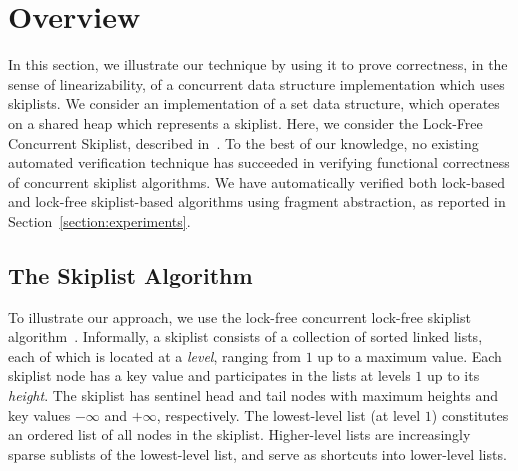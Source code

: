 \section{Overview}
\label{sec:overview}

  In this section, we illustrate our technique by using it to prove correctness, in
the sense of linearizability, of
a concurrent data structure implementation which uses skiplists.
We consider an implementation of a set data structure, which operates on
a shared heap which represents a skiplist. Here, we consider the
Lock-Free Concurrent Skiplist, described in~\cite[Section 14.4]{ArtOfMpP}.
To the best of our knowledge, no existing automated verification technique
has succeeded in verifying functional correctness of concurrent
skiplist algorithms.
We have automatically verified both lock-based and lock-free skiplist-based algorithms using fragment
abstraction, as reported in Section~\ref{section:experiments}.


\subsection{The Skiplist Algorithm}
  
To illustrate our approach, we use the lock-free concurrent lock-free skiplist algorithm~\cite[Section 14.4]{ArtOfMpP}. Informally, a skiplist consists of a collection of sorted linked lists, each of which is located at a {\em level}, ranging from $1$ up to a maximum value. Each skiplist node has a key value and participates in the lists at levels $1$ up to its {\em height}.
The skiplist has sentinel head and tail nodes with maximum heights and key values $-\infty$ and $+\infty$, respectively.
The lowest-level list (at level $1$) constitutes an ordered list of all nodes
in the skiplist. Higher-level lists are increasingly sparse sublists of the
lowest-level list, and serve as shortcuts into lower-level lists.
% 

